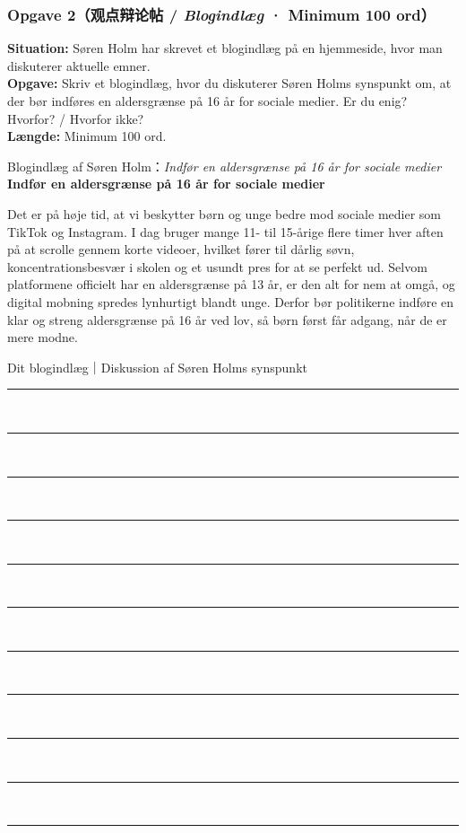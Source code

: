 \subsubsection*{Opgave 2（观点辩论帖 / \textit{Blogindlæg} · Minimum 100 ord）}

\textbf{Situation:} Søren Holm har skrevet et blogindlæg på en hjemmeside, hvor man diskuterer aktuelle emner.\\
\textbf{Opgave:} Skriv et blogindlæg, hvor du diskuterer Søren Holms synspunkt om, at der bør indføres en aldersgrænse på 16 år for sociale medier. Er du enig? Hvorfor? / Hvorfor ikke?\\
\textbf{Længde:} Minimum 100 ord.

\begin{emailbox}{Blogindlæg af Søren Holm：\textit{Indfør en aldersgrænse på 16 år for sociale medier}}
\textbf{\color{NCDNavy}Indfør en aldersgrænse på 16 år for sociale medier}

\vspace{0.3em}
Det er på høje tid, at vi beskytter børn og unge bedre mod sociale medier som TikTok og Instagram. I dag bruger mange 11- til 15-årige flere timer hver aften på at scrolle gennem korte videoer, hvilket fører til dårlig søvn, koncentrationsbesvær i skolen og et usundt pres for at se perfekt ud. Selvom platformene officielt har en aldersgrænse på 13 år, er den alt for nem at omgå, og digital mobning spredes lynhurtigt blandt unge. Derfor bør politikerne indføre en klar og streng aldersgrænse på 16 år ved lov, så børn først får adgang, når de er mere modne.
\end{emailbox}

\begin{emailbox}{Dit blogindlæg｜Diskussion af Søren Holms synspunkt}
\vspace{0.3em}
\rule{\linewidth}{0.4pt}\\[0.55em]
\rule{\linewidth}{0.4pt}\\[0.55em]
\rule{\linewidth}{0.4pt}\\[0.55em]
\rule{\linewidth}{0.4pt}\\[0.55em]
\rule{\linewidth}{0.4pt}\\[0.55em]
\rule{\linewidth}{0.4pt}\\[0.55em]
\rule{\linewidth}{0.4pt}\\[0.55em]
\rule{\linewidth}{0.4pt}\\[0.55em]
\rule{\linewidth}{0.4pt}\\[0.55em]
\rule{\linewidth}{0.4pt}\\[0.55em]
\rule{\linewidth}{0.4pt}
\end{emailbox}

